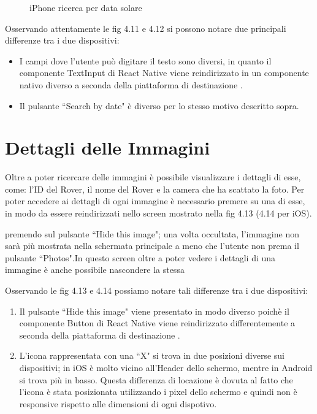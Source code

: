 \begin{figure}[h]
\begin{minipage}[h]{0.47\textwidth}
        \caption{\label{SearchbyDateIphone}iPhone ricerca per data solare}
    \end{minipage}
\end{figure}

Osservando attentamente le fig 4.11 e 4.12 si possono notare due principali differenze tra i due dispositivi:
\begin{itemize}
    \item I campi dove l'utente pu\`o digitare il testo sono diversi, in quanto il componente TextInput di React Native viene reindirizzato in un componente nativo diverso a seconda della piattaforma di destinazione \cite{ReactNativeComponent}.
    \item Il pulsante ``Search by date" \`e diverso per lo stesso motivo descritto sopra.
\end{itemize}

\section*{Dettagli delle Immagini}
Oltre a poter ricercare delle immagini \`e possibile visualizzare i dettagli di esse, come: l'ID del Rover, il nome del Rover e la camera che ha scattato la foto.
Per poter accedere ai dettagli di ogni immagine \`e necessario premere su una di esse, in modo da essere reindirizzati nello screen mostrato nella fig 4.13 (4.14 per iOS).

 premendo sul pulsante ``Hide this image"; una volta occultata, l'immagine non sar\`a pi\`u mostrata nella schermata principale a meno che l'utente non prema il pulsante ``Photos".In questo screen oltre a poter vedere i dettagli di una immagine \`e anche possibile nascondere la stessa

Osservando le fig 4.13 e 4.14 possiamo notare tali differenze tra i due dispositivi:
\begin{enumerate}
    \item Il pulsante ``Hide this image" viene presentato in modo diverso poich\`e il componente Button di React Native viene reindirizzato differentemente a seconda della piattaforma di destinazione \cite{ReactNativeComponent}.
    \item L'icona rappresentata con una ``X" si trova in due posizioni diverse sui dispositivi; in iOS \`e molto vicino all'Header dello schermo, mentre in Android si trova pi\`u in basso. Questa differenza di locazione
    \`e dovuta al fatto che l'icona \`e stata posizionata utilizzando i pixel dello schermo e quindi non \`e responsive rispetto alle dimensioni di ogni dispotivo.
\end{enumerate}

